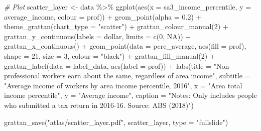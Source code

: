 \documentclass[
]{book}
\newenvironment{Shaded}{\begin{snugshade}}{\end{snugshade}}
\newcommand{\AttributeTok}[1]{\textcolor[rgb]{0.77,0.63,0.00}{#1}}
\newcommand{\CommentTok}[1]{\textcolor[rgb]{0.56,0.35,0.01}{\textit{#1}}}
\newcommand{\ConstantTok}[1]{\textcolor[rgb]{0.00,0.00,0.00}{#1}}
\newcommand{\DecValTok}[1]{\textcolor[rgb]{0.00,0.00,0.81}{#1}}
\newcommand{\FloatTok}[1]{\textcolor[rgb]{0.00,0.00,0.81}{#1}}
\newcommand{\FunctionTok}[1]{\textcolor[rgb]{0.00,0.00,0.00}{#1}}
\newcommand{\NormalTok}[1]{#1}
\newcommand{\OtherTok}[1]{\textcolor[rgb]{0.56,0.35,0.01}{#1}}
\newcommand{\SpecialCharTok}[1]{\textcolor[rgb]{0.00,0.00,0.00}{#1}}
\newcommand{\StringTok}[1]{\textcolor[rgb]{0.31,0.60,0.02}{#1}}
\begin{document}
\begin{Shaded}
\begin{Highlighting}[]
\CommentTok{\# Plot }
\NormalTok{scatter\_layer }\OtherTok{\textless{}{-}}\NormalTok{ data }\SpecialCharTok{\%\textgreater{}\%} 
  \FunctionTok{ggplot}\NormalTok{(}\FunctionTok{aes}\NormalTok{(}\AttributeTok{x =}\NormalTok{ sa3\_income\_percentile,}
             \AttributeTok{y =}\NormalTok{ average\_income,}
             \AttributeTok{colour =}\NormalTok{ prof)) }\SpecialCharTok{+}
  \FunctionTok{geom\_point}\NormalTok{(}\AttributeTok{alpha =} \FloatTok{0.2}\NormalTok{) }\SpecialCharTok{+} 
  \FunctionTok{theme\_grattan}\NormalTok{(}\AttributeTok{chart\_type =} \StringTok{"scatter"}\NormalTok{) }\SpecialCharTok{+} 
  \FunctionTok{grattan\_colour\_manual}\NormalTok{(}\DecValTok{2}\NormalTok{) }\SpecialCharTok{+} 
  \FunctionTok{grattan\_y\_continuous}\NormalTok{(}\AttributeTok{labels =}\NormalTok{ dollar, }
                       \AttributeTok{limits =} \FunctionTok{c}\NormalTok{(}\DecValTok{0}\NormalTok{, }\ConstantTok{NA}\NormalTok{)) }\SpecialCharTok{+} 
  \FunctionTok{grattan\_x\_continuous}\NormalTok{() }\SpecialCharTok{+} 
  \FunctionTok{geom\_point}\NormalTok{(}\AttributeTok{data =}\NormalTok{ perc\_average,}
             \FunctionTok{aes}\NormalTok{(}\AttributeTok{fill =}\NormalTok{ prof),}
             \AttributeTok{shape =} \DecValTok{21}\NormalTok{,}
             \AttributeTok{size =} \DecValTok{3}\NormalTok{, }
             \AttributeTok{colour =} \StringTok{"black"}\NormalTok{) }\SpecialCharTok{+} 
  \FunctionTok{grattan\_fill\_manual}\NormalTok{(}\DecValTok{2}\NormalTok{) }\SpecialCharTok{+} 
  \FunctionTok{grattan\_label}\NormalTok{(}\AttributeTok{data =}\NormalTok{ label\_data,}
                \FunctionTok{aes}\NormalTok{(}\AttributeTok{label =}\NormalTok{ prof)) }\SpecialCharTok{+} 
  \FunctionTok{labs}\NormalTok{(}\AttributeTok{title =} \StringTok{"Non{-}professional workers earn about the same, regardless of area income"}\NormalTok{,}
       \AttributeTok{subtitle =} \StringTok{"Average income of workers by area income percentile, 2016"}\NormalTok{,}
       \AttributeTok{x =} \StringTok{"Area total income percentile"}\NormalTok{,}
       \AttributeTok{y =} \StringTok{"Average income"}\NormalTok{,}
       \AttributeTok{caption =} \StringTok{"Notes: Only includes people who submitted a tax return in 2016{-}16. Source: ABS (2018)"}\NormalTok{)}
\end{Highlighting}
\end{Shaded}

\begin{Shaded}
\begin{Highlighting}[]
\FunctionTok{grattan\_save}\NormalTok{(}\StringTok{"atlas/scatter\_layer.pdf"}\NormalTok{, scatter\_layer, }\AttributeTok{type =} \StringTok{"fullslide"}\NormalTok{)}
\end{Highlighting}
\end{Shaded}
\end{document}
